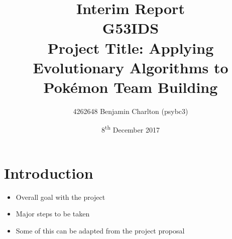 \documentclass[a4paper]{article}
\newcommand{\Pokemon}{Pok\'{e}mon}
\begin{document}
\title{
    Interim Report
    \\ \large{G53IDS}
    \\ \large{Project Title: Applying Evolutionary Algorithms to \Pokemon{} Team Building}\vspace{-3ex}}
\author{4262648 Benjamin Charlton (psybc3)}
\date{\vspace{-2ex}8\textsuperscript{th} December 2017}
\maketitle

\section{Introduction}
\begin{itemize}
    \item Overall goal with the project
    \item Major steps to be taken
    \item Some of this can be adapted from the project proposal
\end{itemize}
\end{document}
